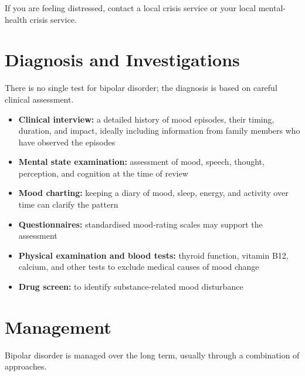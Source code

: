 If you are feeling distressed, contact a local crisis service or your local mental-health crisis service.

\section*{Diagnosis and Investigations}
There is no single test for bipolar disorder; the diagnosis is based on careful clinical assessment.

\begin{itemize}
    \item \textbf{Clinical interview:} a detailed history of mood episodes, their timing, duration, and impact, ideally including information from family members who have observed the episodes
    \item \textbf{Mental state examination:} assessment of mood, speech, thought, perception, and cognition at the time of review
    \item \textbf{Mood charting:} keeping a diary of mood, sleep, energy, and activity over time can clarify the pattern
    \item \textbf{Questionnaires:} standardised mood-rating scales may support the assessment
    \item \textbf{Physical examination and blood tests:} thyroid function, vitamin B12, calcium, and other tests to exclude medical causes of mood change
    \item \textbf{Drug screen:} to identify substance-related mood disturbance
\end{itemize}

\section*{Management}
Bipolar disorder is managed over the long term, usually through a combination of approaches.

